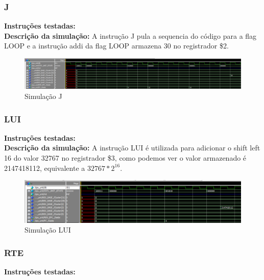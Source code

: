 \newpage
\subsubsection{J}
\textbf{Instruções testadas:}
 \\

\textbf{Descrição da simulação:} A instrução J pula a sequencia do código para a flag LOOP e a instrução addi da flag LOOP armazena 30 no registrador \$2. \\

\begin{figure}[htbp!]
\centering
\includegraphics[width=1\textwidth]{figure/simulacao_j.png}
\caption{Simulação J} 
\label{fig:imagem_massa}
\end{figure}

\subsubsection{LUI}
\textbf{Instruções testadas:}
 \\

\textbf{Descrição da simulação:} A instrução LUI é utilizada para adicionar o shift left 16 do valor 32767 no registrador \$3, como podemos ver o valor armazenado é 2147418112, equivalente a $32767*2^{16}$. \\

\begin{figure}[htbp!]
\centering
\includegraphics[width=1\textwidth]{figure/simulacao_lui.png}
\caption{Simulação LUI} 
\label{fig:imagem_massa}
\end{figure}

\newpage
\subsubsection{RTE}
\textbf{Instruções testadas:}
 \\

